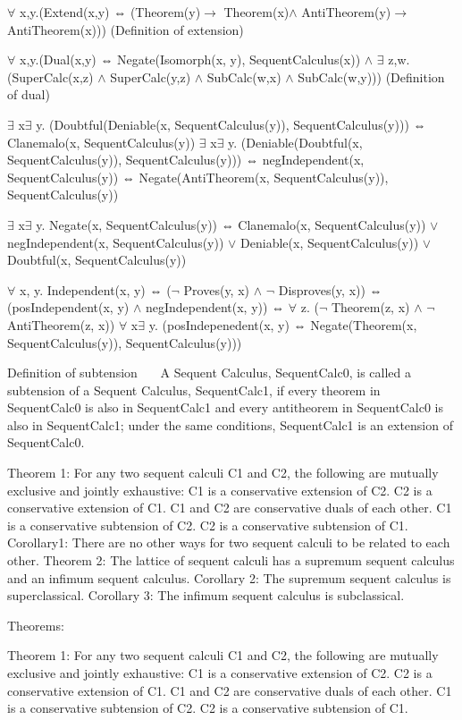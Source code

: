 $\forall$ x,y.(Extend(x,y) ⇔ (Theorem(y)$\to$ Theorem(x)$\land$ AntiTheorem(y)$\to$ AntiTheorem(x))) (Definition of extension)

$\forall$ x,y.(Dual(x,y) ⇔ Negate(Isomorph(x, y), SequentCalculus(x)) $\land$  $\exists$ z,w.(SuperCalc(x,z) $\land$  SuperCalc(y,z) $\land$  SubCalc(w,x) $\land$  SubCalc(w,y))) (Definition of dual)

$\exists$ x$\exists$ y. (Doubtful(Deniable(x, SequentCalculus(y)), SequentCalculus(y))) ⇔ Clanemalo(x, SequentCalculus(y))
$\exists$ x$\exists$ y. (Deniable(Doubtful(x, SequentCalculus(y)), SequentCalculus(y))) ⇔ negIndependent(x, SequentCalculus(y)) ⇔ Negate(AntiTheorem(x, SequentCalculus(y)), SequentCalculus(y))

$\exists$ x$\exists$ y. Negate(x, SequentCalculus(y)) ⇔ Clanemalo(x, SequentCalculus(y)) $\lor$  negIndependent(x, SequentCalculus(y)) $\lor$  Deniable(x, SequentCalculus(y)) $\lor$  Doubtful(x, SequentCalculus(y))

$\forall$ x, y. Independent(x, y) ⇔ ($\neg$ Proves(y, x) $\land$  $\neg$ Disproves(y, x)) ⇔ (posIndependent(x, y) $\land$  negIndependent(x, y)) ⇔ $\forall$ z. ($\neg$ Theorem(z, x) $\land$  $\neg$ AntiTheorem(z, x))
$\forall$ x$\exists$ y. (posIndepenedent(x, y) ⇔ Negate(Theorem(x, SequentCalculus(y)), SequentCalculus(y)))

   Definition of subtension   
A Sequent Calculus, SequentCalc0, is called a subtension of a Sequent Calculus, SequentCalc1, if every theorem in SequentCalc0 is also in SequentCalc1 and every antitheorem in SequentCalc0 is also in SequentCalc1; under the same conditions, SequentCalc1 is an extension of SequentCalc0.

Theorem 1: For any two sequent calculi C1 and C2, the following are mutually exclusive and jointly exhaustive:
C1 is a conservative extension of C2.
C2 is a conservative extension of C1.
C1 and C2 are conservative duals of each other.
C1 is a conservative subtension of C2.
C2 is a conservative subtension of C1.
Corollary1: There are no other ways for two sequent calculi to be related to each other.
Theorem 2: The lattice of sequent calculi has a supremum sequent calculus and an infimum sequent calculus.
Corollary 2: The supremum sequent calculus is superclassical.
Corollary 3: The infimum sequent calculus is subclassical.

Theorems:

Theorem 1: For any two sequent calculi C1 and C2, the following are mutually exclusive and jointly exhaustive:
C1 is a conservative extension of C2.
C2 is a conservative extension of C1.
C1 and C2 are conservative duals of each other.
C1 is a conservative subtension of C2.
C2 is a conservative subtension of C1.

